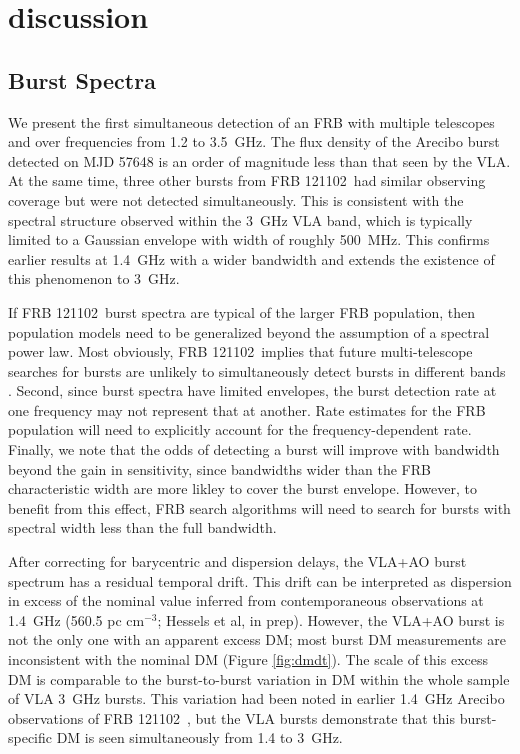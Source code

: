 \documentclass[twocolumn]{aastex61}
\newcommand{\frb}{FRB 121102}
\begin{document}
\section{discussion}
\label{sec:disc}

\subsection{Burst Spectra}

We present the first simultaneous detection of an FRB with multiple telescopes and over frequencies from 1.2 to 3.5~GHz. The flux density of the Arecibo burst detected on MJD 57648 is an order of magnitude less than that seen by the VLA. At the same time, three other bursts from \frb\ had similar observing coverage but were not detected simultaneously. This is consistent with the spectral structure observed within the 3~GHz VLA band, which is typically limited to a Gaussian envelope with width of roughly 500~MHz. This confirms earlier results at 1.4~GHz \citep{2016Natur.531..202S, 2016arXiv160308880S} with a wider bandwidth and extends the existence of this phenomenon to 3~GHz.

If \frb\ burst spectra are typical of the larger FRB population, then population models need to be generalized beyond the assumption of a spectral power law. Most obviously, \frb\ implies that future multi-telescope searches for bursts are unlikely to simultaneously detect bursts in different bands \citep[c.f.][]{1999ApJ...517..460S}. Second, since burst spectra have limited envelopes, the burst detection rate at one frequency may not represent that at another. Rate estimates for the FRB population will need to explicitly account for the frequency-dependent rate. Finally, we note that the odds of detecting a burst will improve with bandwidth beyond the gain in sensitivity, since bandwidths wider than the FRB characteristic width are more likley to cover the burst envelope. However, to benefit from this effect, FRB search algorithms will need to search for bursts with spectral width less than the full bandwidth.

After correcting for barycentric and dispersion delays, the VLA+AO burst spectrum has a residual temporal drift. This drift can be interpreted as dispersion in excess of the nominal value inferred from contemporaneous observations at 1.4~GHz (560.5 pc cm$^{-3}$; Hessels et al, in prep). However, the VLA+AO burst is not the only one with an apparent excess DM; most burst DM measurements are inconsistent with the nominal DM (Figure \ref{fig:dmdt}). The scale of this excess DM is comparable to the burst-to-burst variation in DM within the whole sample of VLA 3~GHz bursts. This variation had been noted in earlier 1.4~GHz Arecibo observations of \frb\ \citep{2016Natur.531..202S,2016arXiv160308880S}, but the VLA bursts demonstrate that this burst-specific DM is seen simultaneously from 1.4 to 3~GHz.
\end{document}
